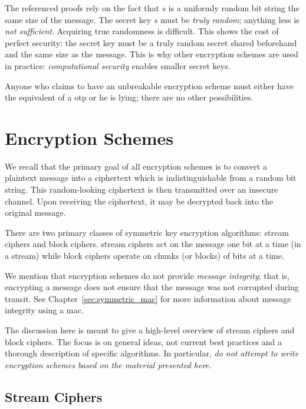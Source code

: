 The referenced proofs rely on the fact that $s$ is a uniformly
random bit string the same size of the message.
The secret key $s$ must be \emph{truly random};
anything less is \emph{not sufficient}.
Acquiring true randomness is difficult.
This shows the cost of \gls{perfect security}:
the secret key must be a truly random secret shared beforehand
and the same size as the message.
This is why other \glspl{encryption scheme} are used in practice:
\emph{computational security} enables smaller secret keys.

Anyone who claims to have an unbreakable \gls{encryption scheme} must
either have the equivalent of a \gls{otp} or he is lying;
there are no other possibilities.



\section{Encryption Schemes}

We recall that the primary goal of all \glspl{encryption scheme}
is to convert a plaintext message into a ciphertext which
is indistinguishable from a random bit string.
This random-looking ciphertext is then transmitted over
an \gls{insecure channel}.
Upon receiving the ciphertext, it may be decrypted back into
the original message.

There are two primary classes of \gls{symmetric key encryption} algorithms:
\glspl{stream cipher} and \glspl{block cipher}.
\Glspl{stream cipher} act on the message one bit at a time (in a stream)
while \glspl{block cipher} operate on chunks (or blocks) of bits at a time.

We mention that \glspl{encryption scheme} do not provide
\emph{message integrity};
that is, encrypting a message does not ensure that the message was
not corrupted during transit.
See Chapter~\ref{sec:symmetric_mac} for more information
about message integrity using a \gls{mac}.

The discussion here is meant to give a high-level overview
of \glspl{stream cipher} and \glspl{block cipher}.
The focus is on general ideas,
not current best practices and a thorough description of specific algorithms.
In particular, \emph{do not attempt to write \glspl{encryption scheme}
based on the material presented here.}


\subsection{Stream Ciphers}

